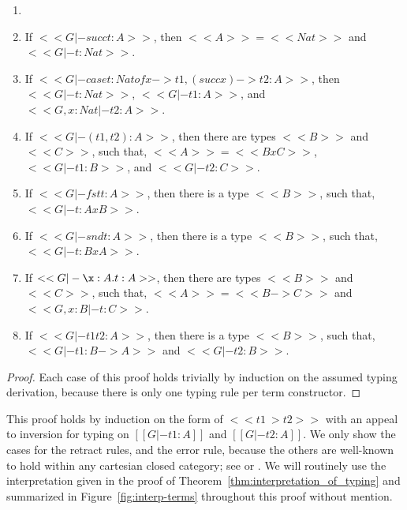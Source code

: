 \begin{lemma}
  \label{lemma:inversion_for_typing}
  \begin{enumerate}[label=\roman*.]
  \item[]
  \item If $<<G |- succ t : A>>$, then $<<A>> = <<Nat>>$ and $<<G |- t : Nat>>$.
  \item If $<<G |- case t : Nat of x -> t1, (succ x) -> t2 : A>>$, then $<<G |- t : Nat>>$, $<<G |- t1 : A>>$, and $<<G, x : Nat |- t2 : A>>$.
  \item If $<<G |- (t1, t2) : A>>$, then there are types $<<B>>$ and $<<C>>$, such that, $<<A>> = <<B x C>>$, $<<G |- t1 : B>>$, and $<<G |- t2 : C>>$.
  \item If $<<G |- fst t : A>>$, then there is a type $<<B>>$, such that, $<<G |- t : A x B>>$.
  \item If $<<G |- snd t : A>>$, then there is a type $<<B>>$, such that, $<<G |- t : B x A>>$.
  \item If $<<G |- \x:A.t : A>>$, then there are types $<<B>>$ and $<<C>>$, such that, $<<A>> = <<B -> C>>$ and $<<G, x : B |- t : C>>$.
  \item If $<<G |- t1 t2 : A>>$, then there is a type $<<B>>$, such that, $<<G |- t1 : B -> A>>$ and $<<G |- t2 : B>>$.
  \end{enumerate}
\end{lemma}
\begin{proof}
  Each case of this proof holds trivially by induction on the assumed
  typing derivation, because there is only one typing rule per term
  constructor.
\end{proof}

This proof holds by induction on the form of $<<t1 ~> t2>>$ with an
appeal to inversion for typing on $[[G |- t1 : A]]$ and $[[G |- t2 :
    A]]$.  We only show the cases for the retract rules, and the error
rule, because the others are well-known to hold within any cartesian
closed category; see \cite{Lambek:1980} or \cite{Crole:1994}.  We will
routinely use the interpretation given in the proof of
Theorem~\ref{thm:interpretation_of_typing} and summarized in
Figure~\ref{fig:interp-terms} throughout this proof without mention.

